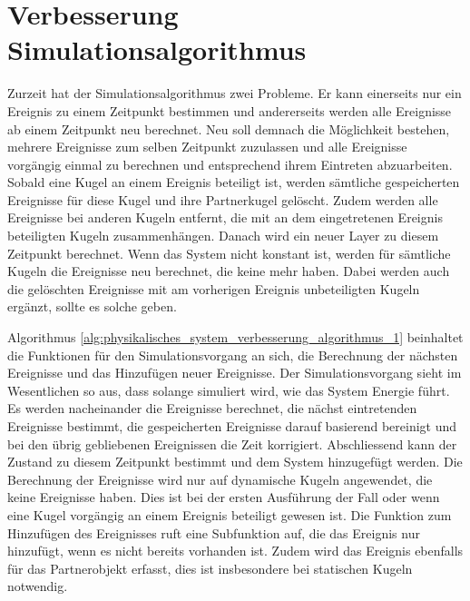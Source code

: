 \section{Verbesserung Simulationsalgorithmus}\label{anhang:simulation:algorithmus}
Zurzeit hat der Simulationsalgorithmus zwei Probleme. Er kann einerseits nur ein Ereignis zu einem Zeitpunkt bestimmen und
andererseits werden alle Ereignisse ab einem Zeitpunkt neu berechnet. Neu soll demnach die Möglichkeit bestehen, mehrere
Ereignisse zum selben Zeitpunkt zuzulassen und alle Ereignisse vorgängig einmal zu berechnen und entsprechend ihrem Eintreten
abzuarbeiten. Sobald eine Kugel an einem Ereignis beteiligt ist, werden sämtliche gespeicherten Ereignisse für diese Kugel und
ihre Partnerkugel gelöscht. Zudem werden alle Ereignisse bei anderen Kugeln entfernt, die mit an dem eingetretenen Ereignis beteiligten Kugeln
zusammenhängen. Danach wird ein neuer Layer zu diesem Zeitpunkt berechnet. Wenn das System nicht konstant ist, werden
für sämtliche Kugeln die Ereignisse neu berechnet, die keine mehr haben. Dabei werden auch die gelöschten Ereignisse
mit am vorherigen Ereignis unbeteiligten Kugeln ergänzt, sollte es solche geben.

Algorithmus \ref{alg:physikalisches_system_verbesserung_algorithmus_1} beinhaltet die Funktionen für den Simulationsvorgang
an sich, die Berechnung der nächsten Ereignisse und das Hinzufügen neuer Ereignisse. Der Simulationsvorgang sieht im
Wesentlichen so aus, dass solange simuliert wird, wie das System Energie führt. Es werden nacheinander die Ereignisse berechnet,
die nächst eintretenden Ereignisse bestimmt, die gespeicherten Ereignisse darauf basierend bereinigt und bei den übrig
gebliebenen Ereignissen die Zeit korrigiert. Abschliessend kann der Zustand zu diesem Zeitpunkt bestimmt und
dem System hinzugefügt werden. Die Berechnung der Ereignisse wird nur auf dynamische Kugeln angewendet, die keine Ereignisse haben.
Dies ist bei der ersten Ausführung der Fall oder wenn eine Kugel vorgängig an einem Ereignis beteiligt gewesen ist.
Die Funktion zum Hinzufügen des Ereignisses ruft eine Subfunktion auf, die das Ereignis nur hinzufügt, wenn es nicht bereits vorhanden ist.
Zudem wird das Ereignis ebenfalls für das Partnerobjekt erfasst, dies ist insbesondere bei statischen Kugeln notwendig.

